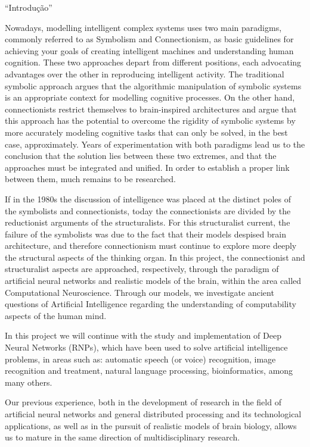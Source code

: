 ``Introdu\c{c}\~{a}o''

Nowadays, modelling intelligent complex systems uses two main paradigms, commonly
referred to as Symbolism and Connectionism, as basic guidelines for achieving your
goals of creating intelligent machines and understanding human cognition. These
two approaches depart from different positions, each advocating advantages over
the other in reproducing intelligent activity. The traditional symbolic approach
argues that the algorithmic manipulation of symbolic systems is an appropriate context
for modelling cognitive processes. On the other hand, connectionists restrict themselves
to brain-inspired architectures and argue that this approach has the potential to
overcome the rigidity of symbolic systems by more accurately modeling cognitive tasks
that can only be solved, in the best case, approximately. Years of experimentation
with both paradigms lead us to the conclusion that the solution lies between these
two extremes, and that the approaches must be integrated and unified. In order to
establish a proper link between them, much remains to be researched.

If in the 1980s the discussion of intelligence was placed at the distinct poles
of the symbolists and connectionists, today the connectionists are divided by the
reductionist arguments of the structuralists. For this structuralist current, the
failure of the symbolists was due to the fact that their models despised brain architecture,
and therefore connectionism must continue to explore more deeply the structural aspects
of the thinking organ. In this project, the connectionist and structuralist aspects
are approached, respectively, through the paradigm of artificial neural networks
and realistic models of the brain, within the area called Computational Neuroscience.
Through our models, we investigate ancient questions of Artificial Intelligence regarding
the understanding of computability aspects of the human mind.

In this project we will continue with the study and implementation of Deep Neural
Networks (RNPs), which have been used to solve artificial intelligence problems,
in areas such as: automatic speech (or voice) recognition, image recognition and
treatment, natural language processing, bioinformatics, among many others.

Our previous experience, both in the development of research in the field of artificial
neural networks and general distributed processing and its technological applications,
as well as in the pursuit of realistic models of brain biology, allows us to mature
in the same direction of multidisciplinary research.


